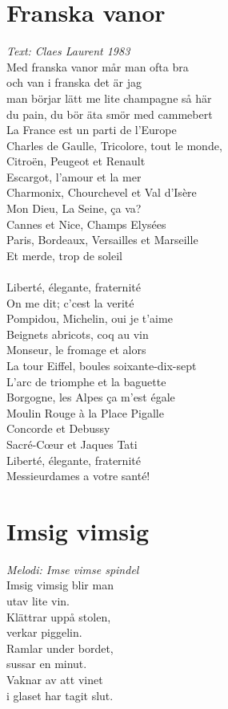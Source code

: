 \section{Franska vanor}
\textit{Text: Claes Laurent 1983}
\vspace{2mm}\\
Med franska vanor mår man ofta bra\\
och van i franska det är jag\\
man börjar lätt me lite champagne så här\\
du pain, du bör äta smör med cammebert\\
La France est un parti de l'Europe\\
Charles de Gaulle, Tricolore, tout le monde,\\
Citroën, Peugeot et Renault\\
Escargot, l'amour et la mer\\
Charmonix, Chourchevel et Val d'Isère\\
Mon Dieu, La Seine, ça va?\\
Cannes et Nice, Champs Elysées\\
Paris, Bordeaux, Versailles et Marseille\\
Et merde, trop de soleil\\
\\
Liberté, élegante, fraternité\\
On me dit; c'cest la verité\\
Pompidou, Michelin, oui je t'aime\\
Beignets abricots, coq au vin\\
Monseur, le fromage et alors\\
La tour Eiffel, boules soixante-dix-sept\\
L'arc de triomphe et la baguette\\
Borgogne, les Alpes ça m'est égale\\
Moulin Rouge à la Place Pigalle\\
Concorde et Debussy\\
Sacré-C\oe{}ur et Jaques Tati\\
Liberté, élegante, fraternité\\
Messieurdames a votre santé!\\

\section{Imsig vimsig}
\textit{Melodi: Imse vimse spindel}
\vspace{2mm}\\
Imsig vimsig blir man\\
utav lite vin.\\
Klättrar uppå stolen,\\
verkar piggelin.\\
Ramlar under bordet,\\
sussar en minut.\\
Vaknar av att vinet\\
i glaset har tagit slut.\\

